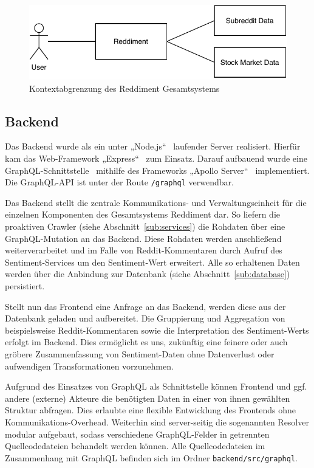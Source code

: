 \documentclass[a4paper, 10pt, conference]{IEEEtran}
\begin{document}
\begin{figure}[ht]
	\centering
	\includegraphics[width=\linewidth]{context}
	\caption{Kontextabgrenzung des Reddiment Gesamtsystems}
	\label{fig:context}
\end{figure}

\subsection{Backend} \label{sub:backend}
Das Backend wurde als ein unter „Node.js“~\cite{node} laufender Server realisiert. Hierfür kam das Web-Framework „Express“~\cite{express} zum Einsatz. Darauf aufbauend wurde eine GraphQL-Schnittstelle~\cite{graphql} mithilfe des Frameworks „Apollo Server“~\cite{apolloserver} implementiert. Die GraphQL-API ist unter der Route \texttt{/graphql} verwendbar.

Das Backend stellt die zentrale Kommunikations- und Verwaltungseinheit für die einzelnen Komponenten des Gesamtsystems Reddiment dar. So liefern die proaktiven Crawler (siehe Abschnitt~\ref{sub:services}) die Rohdaten über eine GraphQL-Mutation an das Backend. Diese Rohdaten werden anschließend weiterverarbeitet und im Falle von Reddit-Kommentaren durch Aufruf des Sentiment-Services um den Sentiment-Wert erweitert. Alle so erhaltenen Daten werden über die Anbindung zur Datenbank (siehe Abschnitt~\ref{sub:database}) persistiert.

Stellt nun das Frontend eine Anfrage an das Backend, werden diese aus der Datenbank geladen und aufbereitet. Die Gruppierung und Aggregation von beispielsweise Reddit-Kommentaren sowie die Interpretation des Sentiment-Werts erfolgt im Backend. Dies ermöglicht es uns, zukünftig eine feinere oder auch gröbere Zusammenfassung von Sentiment-Daten ohne Datenverlust oder aufwendigen Transformationen vorzunehmen.

Aufgrund des Einsatzes von GraphQL als Schnittstelle können Frontend und ggf. andere (externe) Akteure die benötigten Daten in einer von ihnen gewählten Struktur abfragen. Dies erlaubte eine flexible Entwicklung des Frontends ohne Kommunikations-Overhead. Weiterhin sind server-seitig die sogenannten Resolver modular aufgebaut, sodass verschiedene GraphQL-Felder in getrennten Quellcodedateien behandelt werden können. Alle Quellcodedateien im Zusammenhang mit GraphQL befinden sich im Ordner \texttt{backend/src/graphql}.
\end{document}
